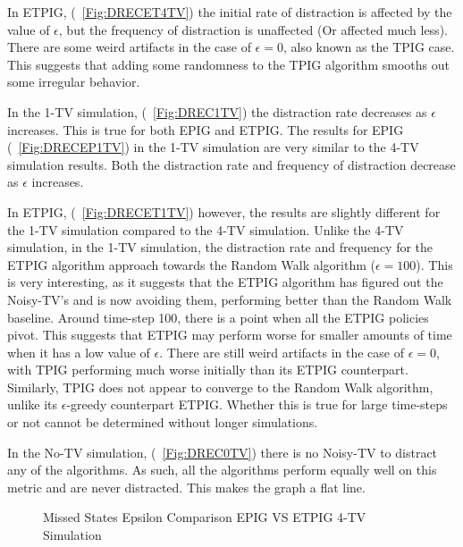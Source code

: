 \documentclass[letterpaper]{article} %
\begin{document}
In ETPIG, (\figurename~\ref{Fig:DRECET4TV}) the initial rate of distraction is affected by the value of $\epsilon$, but the frequency of distraction is unaffected (Or affected much less). There are some weird artifacts in the case of $\epsilon = 0$, also known as the TPIG case. This suggests that adding some randomness to the TPIG algorithm smooths out some irregular behavior.

In the 1-TV simulation, (\figurename~\ref{Fig:DREC1TV}) the distraction rate decreases as $\epsilon$ increases. This is true for both EPIG and ETPIG. The results for EPIG (\figurename~\ref{Fig:DRECEP1TV}) in the 1-TV simulation are very similar to the 4-TV simulation results. Both the distraction rate and frequency of distraction decrease as $\epsilon$ increases.

In ETPIG, (\figurename~\ref{Fig:DRECET1TV}) however, the results are slightly different for the 1-TV simulation compared to the 4-TV simulation. Unlike the 4-TV simulation, in the 1-TV simulation, the distraction rate and frequency for the ETPIG algorithm approach towards the Random Walk algorithm ($\epsilon = 100$). This is very interesting, as it suggests that the ETPIG algorithm has figured out the Noisy-TV's and is now avoiding them, performing better than the Random Walk baseline. Around time-step 100, there is a point when all the ETPIG policies pivot. This suggests that ETPIG may perform worse for smaller amounts of time when it has a low value of $\epsilon$. There are still weird artifacts in the case of $\epsilon = 0$, with TPIG performing much worse initially than its ETPIG counterpart. Similarly, TPIG does not appear to converge to the Random Walk algorithm, unlike its $\epsilon$-greedy counterpart ETPIG. Whether this is true for large time-steps or not cannot be determined without longer simulations. 

In the No-TV simulation, (\figurename~\ref{Fig:DREC0TV}) there is no Noisy-TV to distract any of the algorithms. As such, all the algorithms perform equally well on this metric and are never distracted. This makes the graph a flat line.
\begin{figure}
	\begin{center}
		\hfill
			
		\hfill
	\end{center}
	\caption{Missed States Epsilon Comparison EPIG VS ETPIG 4-TV Simulation}
	\label{Fig:EMEC4TV}
\end{figure}
\end{document}
